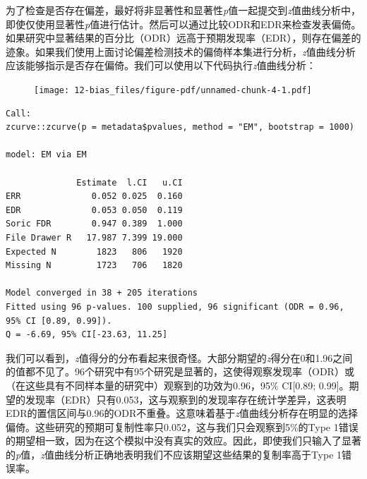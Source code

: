 \documentclass[
  letterpaper,
  DIV=11,
  numbers=noendperiod]{scrreprt}
\newenvironment{Shaded}{\begin{snugshade}}{\end{snugshade}}
\newcommand{\AttributeTok}[1]{\textcolor[rgb]{0.40,0.45,0.13}{#1}}
\newcommand{\ConstantTok}[1]{\textcolor[rgb]{0.56,0.35,0.01}{#1}}
\newcommand{\DecValTok}[1]{\textcolor[rgb]{0.68,0.00,0.00}{#1}}
\newcommand{\FunctionTok}[1]{\textcolor[rgb]{0.28,0.35,0.67}{#1}}
\newcommand{\NormalTok}[1]{\textcolor[rgb]{0.00,0.23,0.31}{#1}}
\newcommand{\OtherTok}[1]{\textcolor[rgb]{0.00,0.23,0.31}{#1}}
\newcommand{\SpecialCharTok}[1]{\textcolor[rgb]{0.37,0.37,0.37}{#1}}
\newcommand{\StringTok}[1]{\textcolor[rgb]{0.13,0.47,0.30}{#1}}
\begin{document}
为了检查是否存在偏差，最好将非显著性和显著性\emph{p}值一起提交到\emph{z}值曲线分析中，即使仅使用显著性\emph{p}值进行估计。然后可以通过比较ODR和EDR来检查发表偏倚。如果研究中显著结果的百分比（ODR）远高于预期发现率（EDR），则存在偏差的迹象。如果我们使用上面讨论偏差检测技术的偏倚样本集进行分析，\emph{z}值曲线分析应该能够指示是否存在偏倚。我们可以使用以下代码执行\emph{z}值曲线分析：

\begin{Shaded}
\end{Shaded}

\begin{figure}

{\centering \texttt{[image: 12-bias\_files/figure-pdf/unnamed-chunk-4-1.pdf]}

}

\end{figure}

\begin{verbatim}
Call:
zcurve::zcurve(p = metadata$pvalues, method = "EM", bootstrap = 1000)

model: EM via EM

              Estimate  l.CI   u.CI
ERR              0.052 0.025  0.160
EDR              0.053 0.050  0.119
Soric FDR        0.947 0.389  1.000
File Drawer R   17.987 7.399 19.000
Expected N        1823   806   1920
Missing N         1723   706   1820

Model converged in 38 + 205 iterations
Fitted using 96 p-values. 100 supplied, 96 significant (ODR = 0.96, 95% CI [0.89, 0.99]).
Q = -6.69, 95% CI[-23.63, 11.25]
\end{verbatim}

我们可以看到，\emph{z}值得分的分布看起来很奇怪。大部分期望的\emph{z}得分在0和1.96之间的值都不见了。96个研究中有95个研究是显著的，这使得观察发现率（ODR）或（在这些具有不同样本量的研究中）观察到的功效为0.96，95\%
CI{[}0.89;
0.99{]}。期望的发现率（EDR）只有0.053，这与观察到的发现率存在统计学差异，这表明EDR的置信区间与0.96的ODR不重叠。这意味着基于\emph{z}值曲线分析存在明显的选择偏倚。这些研究的预期可复制性率只0.052，这与我们只会观察到5\%的Type
1错误的期望相一致，因为在这个模拟中没有真实的效应。因此，即使我们只输入了显著的\emph{p}值，\emph{z}值曲线分析正确地表明我们不应该期望这些结果的复制率高于Type
1错误率。
\end{document}
